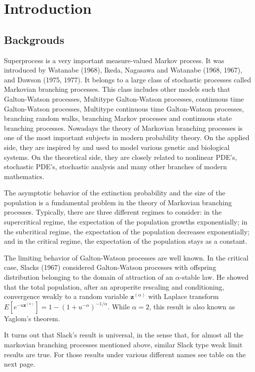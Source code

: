 
\chapter{Introduction}
\section{Backgrouds}
    Superprocess is a very important measure-valued Markov process. It was introduced by Watanabe (1968), Ikeda, Nagasawa and Watanabe (1968, 1967), and Dawson (1975, 1977). It belongs to a large class of stochastic processes called Markovian branching processes. This class includes other models such that Galton-Watson processes, Multitype Galton-Watson processes, continuous time Galton-Watson processes, Multitype continuous time Galton-Watson processes, branching random walks, branching Markov processes and continuous state branching processes.
    Nowadays the theory of Markovian branching processes is one of the most important subjects in modern probability theory.
    On the applied side, they are inspired by and used to model various genetic and biological systems. 
    On the theoretical side, they are closely related to nonlinear PDE's, stochastic PDE's, stochastic analysis and many other branches of modern mathematics.

    The asymptotic behavior of the extinction probability and the size of the population is a fundamental problem in the theory of Markovian branching processes. Typically, there are three different regimes to consider: in the supercritical regime, the expectation of the population growths exponentially; in the subcritical regime, the expectation of the population decreases exponentially; and in the critical regime, the expectation of the population stays as a constant. 

    The limiting behavior of Galton-Watson processes are well known. In the critical case, Slacks (1967) considered Galton-Watson processes with offspring distribution belonging to the domain of attraction of an $\alpha$-stable law. 
    He showed that the total population, after an aproperite rescaling and conditioning, convergence weakly to a random variable $\mathbf z^{(\alpha)}$ with Laplace transform $E[e^{-u\mathbf z^{(\alpha)}}] = 1-(1+u^{-\alpha})^{-1/\alpha}$. While $\alpha = 2$, this result is also known as Yaglom's theorem.
    
    It turns out that Slack's result is universal, in the sense that, for almost all the markovian branching processes mentioned above, similar Slack type weak limit results are true. 
    For those results under various different names see table on the next page.

